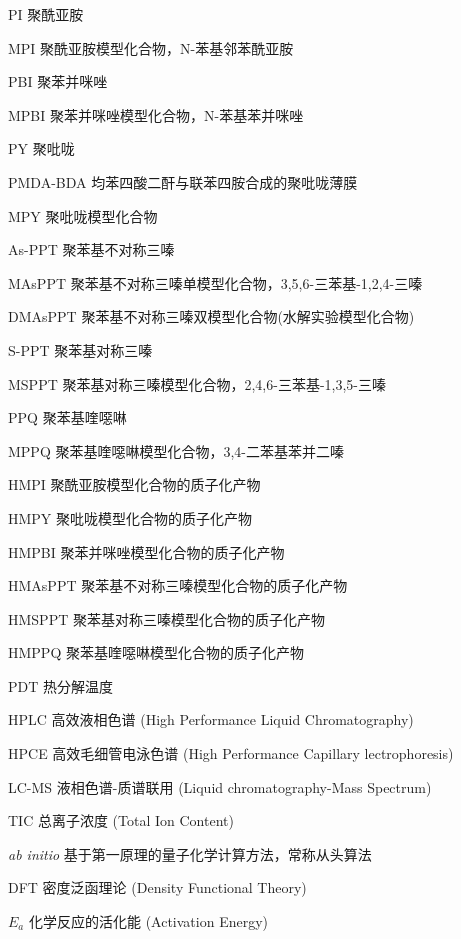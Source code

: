 \documentclass[degree=doctor]{thuthesis}
\begin{document}
\START
\showoutput

\frontmatter
\setcounter{page}{8}
\begin{denotation}[3cm]
  \item[PI] 聚酰亚胺
  \item[MPI] 聚酰亚胺模型化合物，N-苯基邻苯酰亚胺
  \item[PBI] 聚苯并咪唑
  \item[MPBI] 聚苯并咪唑模型化合物，N-苯基苯并咪唑
  \item[PY] 聚吡咙
  \item[PMDA-BDA] 均苯四酸二酐与联苯四胺合成的聚吡咙薄膜
  \item[MPY] 聚吡咙模型化合物
  \item[As-PPT] 聚苯基不对称三嗪
  \item[MAsPPT] 聚苯基不对称三嗪单模型化合物，3,5,6-三苯基-1,2,4-三嗪
  \item[DMAsPPT] 聚苯基不对称三嗪双模型化合物(水解实验模型化合物)
  \item[S-PPT] 聚苯基对称三嗪
  \item[MSPPT] 聚苯基对称三嗪模型化合物，2,4,6-三苯基-1,3,5-三嗪
  \item[PPQ] 聚苯基喹噁啉
  \item[MPPQ] 聚苯基喹噁啉模型化合物，3,4-二苯基苯并二嗪
  \item[HMPI] 聚酰亚胺模型化合物的质子化产物
  \item[HMPY] 聚吡咙模型化合物的质子化产物
  \item[HMPBI] 聚苯并咪唑模型化合物的质子化产物
  \item[HMAsPPT] 聚苯基不对称三嗪模型化合物的质子化产物
  \item[HMSPPT] 聚苯基对称三嗪模型化合物的质子化产物
  \item[HMPPQ] 聚苯基喹噁啉模型化合物的质子化产物
  \item[PDT] 热分解温度
  \item[HPLC] 高效液相色谱 (High Performance Liquid Chromatography)
  \item[HPCE] 高效毛细管电泳色谱 (High Performance Capillary lectrophoresis)
  \item[LC-MS] 液相色谱-质谱联用 (Liquid chromatography-Mass Spectrum)
  \item[TIC] 总离子浓度 (Total Ion Content)
  \item[\textit{ab initio}] 基于第一原理的量子化学计算方法，常称从头算法
  \item[DFT] 密度泛函理论 (Density Functional Theory)
  \item[$E_a$] 化学反应的活化能 (Activation Energy)

\end{denotation}
\end{document}
